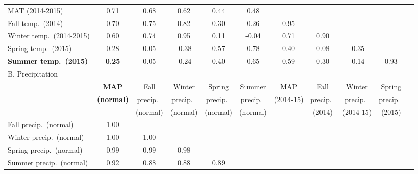 \documentclass{article}
\begin{document}
\begin{landscape}
\begin{longtable}[p]{lcccccccccc}
MAT (2014-2015)          & 0.71     & 0.68       & 0.62         & 0.44         & 0.48         &             &            &              &              & \\
Fall temp.\ (2014)        & 0.70     & 0.75       & 0.82         & 0.30         & 0.26         & 0.95        &            &              &              & \\
Winter temp.\ (2014-2015) & 0.60     & 0.74       & 0.95         & 0.11         & -0.04        & 0.71        & 0.90       &              &              & \\
Spring temp.\ (2015)      & 0.28     & 0.05       & -0.38        & 0.57         & 0.78         & 0.40        & 0.08       & -0.35        &              & \\
\textbf{Summer temp.\ (2015)}      & \textbf{0.25}     & 0.05       & -0.24        & 0.40         & 0.65         & 0.59        & 0.30       & -0.14        & 0.93         & \\
\midrule
B. Precipitation            &          &              &                &                &                &             &              &                &                & \\
\midrule
                            & \textbf{MAP}      & Fall  & Winter  & Spring  & Summer  & MAP         & Fall & Winter & Spring & \\
                            & \textbf{(normal)}     & precip.\ & precip.\ & precip.\ & precip.\ & (2014-15)         & precip.\ & precip.\ & precip.\ & \\
                            &  & (normal)     & (normal)       & (normal)       & (normal)       &  & (2014)       & (2014-15)    & (2015)         \\
Fall  precip.\ (normal)     & 1.00     &              &                &                &                &             &              &                &                & \\
Winter precip.\ (normal)    & 1.00     & 1.00         &                &                &                &             &              &                &                & \\
Spring precip.\ (normal)    & 0.99     & 0.99         & 0.98           &                &                &             &              &                &                & \\
Summer precip.\ (normal)    & 0.92     & 0.88         & 0.88           & 0.89           &                &             &              &                &                & \\

\end{longtable}
\end{landscape}
\end{document}
